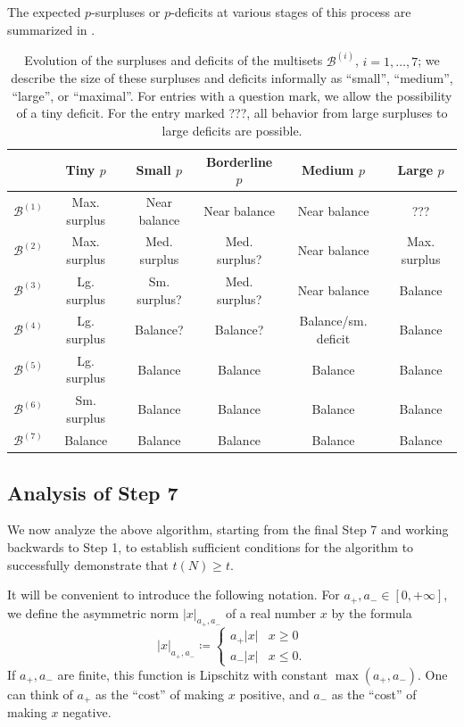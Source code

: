 \documentclass[12pt,a4paper,reqno]{amsart}
\numberwithin{equation}{section}
\theoremstyle{plain}
\theoremstyle{definition}
\newcommand\tuple{{\mathcal B}}
\begin{document}
The expected $p$-surpluses or $p$-deficits at various stages of this process are summarized in .

\begin{table}[h]
  \centering
  \begin{tabular}{|c|c|c|c|c|c|}
  \hline
   & Tiny $p$ & Small $p$ & Borderline $p$ & Medium $p$ & Large $p$ \\
  \hline
  $\tuple^{(1)}$ & Max. surplus & Near balance & Near balance & Near balance & ??? \\
  $\tuple^{(2)}$ & Max. surplus & Med. surplus & Med. surplus? & Near balance & Max. surplus \\
  $\tuple^{(3)}$ & Lg. surplus & Sm. surplus? & Med. surplus? & Near balance & Balance \\
  $\tuple^{(4)}$ & Lg. surplus & Balance? & Balance?
 & Balance/sm. deficit & Balance \\
  $\tuple^{(5)}$ & Lg. surplus & Balance & Balance & Balance  & Balance \\
  $\tuple^{(6)}$ & Sm. surplus & Balance & Balance & Balance  & Balance \\
  $\tuple^{(7)}$ & Balance & Balance & Balance & Balance  & Balance \\
  \hline
  \end{tabular}
  \caption{Evolution of the surpluses and deficits of the multisets $\tuple^{(i)}$, $i=1,\dots,7$; we describe the size of these surpluses and deficits informally as ``small'', ``medium'', ``large'', or ``maximal''.  For entries with a question mark, we allow the possibility of a tiny deficit.  For the entry marked ???, all behavior from large surpluses to large deficits are possible.}\label{algorithm-table}
  \end{table}
  

\subsection{Analysis of Step 7}

We now analyze the above algorithm, starting from the final Step 7 and working backwards to Step 1, to establish sufficient conditions for the algorithm to successfully demonstrate that $t(N) \geq t$.

It will be convenient to introduce the following notation.
For $a_+,a_- \in [0,+\infty]$, we define the asymmetric norm $|x|_{a_+,a_-}$ of a real number $x$ by the formula
$$ 
|x|_{a_+,a_-} \coloneqq  \begin{cases} 
  a_+ |x| & x\geq 0 \\
  a_- |x| & x\leq 0.
\end{cases}
$$
If $a_+,a_-$ are finite, this function is Lipschitz with constant $\max(a_+,a_-)$.  One can think of $a_+$ as the ``cost'' of making $x$ positive, and $a_-$ as the
``cost'' of making $x$ negative.
\end{document}
